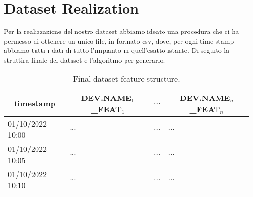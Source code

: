 \section{Dataset Realization}
Per la realizzazione del nostro dataset abbiamo ideato
una procedura che ci ha permesso di ottenere un unico file,
in formato csv, dove, per ogni time stamp abbiamo tutti i dati
di tutto l'impianto in quell'esatto istante. Di seguito
la struttira finale del dataset e l'algoritmo per generarlo.


\begin{table}[H]
	\begin{center}
		\begin{tabular}[c]{l|l|l|l}
			\hline
			\multicolumn{1}{c|}{\textbf{timestamp}}              &
			\multicolumn{1}{c|}{\textbf{DEV.NAME$_1$\_FEAT$_1$}} &
			\multicolumn{1}{c|}{$\ldots$}                        &
			\multicolumn{1}{c}{\textbf{DEV.NAME$_n$\_FEAT$_n$}}                                   \\
			\hline

			01/10/2022 10:00                                     & $\ldots$ & $\ldots$ & $\ldots$ \\
			01/10/2022 10:05                                     & $\ldots$ & $\ldots$ & $\ldots$ \\
			01/10/2022 10:10                                     & $\ldots$ & $\ldots$ & $\ldots$ \\
			\hline
		\end{tabular}
	\end{center}
	\caption{Final dataset feature structure.}\label{tab:datasetform}
\end{table}

